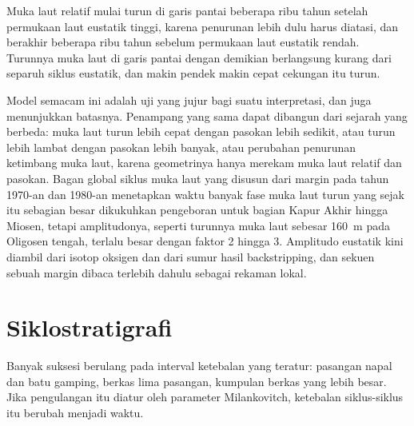 \begin{omfigure}
\par{}\label{fig:b3:sequence-stratigraphy:section}
\end{omfigure}


Muka laut relatif mulai turun di garis pantai beberapa ribu tahun
setelah permukaan laut eustatik tinggi, karena penurunan lebih dulu harus diatasi,
dan berakhir beberapa ribu tahun sebelum permukaan laut eustatik rendah. Turunnya muka laut di
garis pantai dengan demikian berlangsung kurang dari separuh siklus eustatik, dan
makin pendek makin cepat cekungan itu turun.

Model semacam ini adalah uji yang jujur bagi suatu interpretasi, dan juga menunjukkan
batasnya. Penampang yang sama dapat dibangun dari sejarah yang berbeda: muka laut
turun lebih cepat dengan pasokan lebih sedikit, atau turun lebih lambat dengan pasokan lebih banyak, atau perubahan penurunan
ketimbang muka laut, karena geometrinya hanya merekam muka laut relatif
dan pasokan. Bagan global siklus muka laut yang disusun dari margin pada
tahun 1970-an dan 1980-an menetapkan waktu banyak fase muka laut turun yang sejak itu
sebagian besar dikukuhkan pengeboran untuk bagian Kapur Akhir hingga Miosen, tetapi amplitudonya,
seperti turunnya muka laut sebesar \qty{160}{m} pada Oligosen tengah, terlalu besar
dengan faktor 2 hingga 3. Amplitudo eustatik kini diambil dari isotop oksigen dan
dari sumur hasil backstripping, dan sekuen sebuah margin dibaca terlebih dahulu
sebagai rekaman lokal.

\section{Siklostratigrafi}\label{sec:b3:sequence-stratigraphy:cyclo}

Banyak suksesi berulang pada interval ketebalan yang teratur: pasangan
napal dan batu gamping, berkas lima pasangan, kumpulan berkas yang lebih besar. Jika
pengulangan itu diatur oleh parameter Milankovitch, ketebalan
siklus-siklus itu berubah menjadi waktu.

